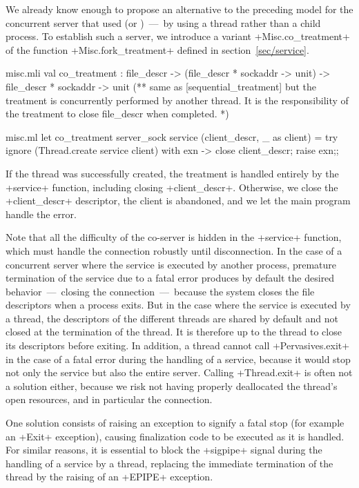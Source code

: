 We already know enough to propose an alternative to the preceding
model for the concurrent server that used  (or
)~---~by using a thread rather than a child process.
To establish such a server, we introduce a variant
\ml+Misc.co_treatment+ of the function \ml+Misc.fork_treatment+
defined in section~\ref{sec/service}.
%
\begin{codefile}{misc.mli}
val co_treatment : 
file_descr -> (file_descr * sockaddr -> unit) -> 
file_descr * sockaddr -> unit
(** same as [sequential_treatment] but the treatment is concurrently
 performed by another thread. It is the responsibility of the treatment 
 to close file_descr when completed. *)
\end{codefile}
%
\begin{listingcodefile}{misc.ml}
let co_treatment server_sock service (client_descr, _ as client) =  
  try ignore (Thread.create service client)
  with exn -> close client_descr; raise exn;;
\end{listingcodefile}
%
If the thread was successfully created, the treatment is handled
entirely by the \ml+service+ function, including closing
\ml+client_descr+.  Otherwise, we close the \ml+client_descr+
descriptor, the client is abandoned, and we let the main program
handle the error.

Note that all the difficulty of the co-server is hidden in the
\ml+service+ function, which must handle the connection robustly until
disconnection.  In the case of a concurrent server where the service
is executed by another process, premature termination of the service
due to a fatal error produces by default the desired behavior~---~closing
the connection~---~because the system closes the file descriptors when a
process exits.  But in the case where the service is executed by a
thread, the descriptors of the different threads are shared by default
and not closed at the termination of the thread.  It is therefore up
to the thread to close its descriptors before exiting.  In addition, a
thread cannot call \ml+Pervasives.exit+ in the case of a fatal error
during the handling of a service, because it would stop not only the
service but also the entire server.  Calling \ml+Thread.exit+ is often
not a solution either, because we risk not having properly
deallocated the thread's open resources, and in particular the
connection.

One solution consists of raising an exception to signify a fatal stop
(for example an \ml+Exit+ exception), causing finalization code to be
executed as it is handled.  For similar reasons, it is essential to
block the \ml+sigpipe+ signal during the handling of a service by a
thread, replacing the immediate termination of the thread by the
raising of an \ml+EPIPE+ exception.

